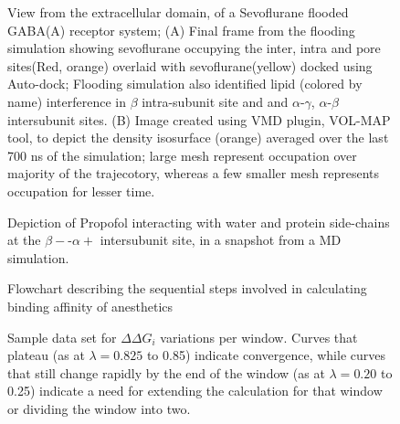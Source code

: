 \documentclass[12pt]{article}
\begin{document}
\begin{figure}
\begin{center}
\centering
\caption{View from the extracellular domain, of a Sevoflurane flooded GABA(A) receptor system; (A) Final frame from the flooding simulation  showing sevoflurane occupying the inter, intra and pore sites(Red, orange) overlaid with sevoflurane(yellow) docked using Auto-dock; Flooding simulation also identified lipid (colored by name) interference in $\beta$ intra-subunit site and and $\alpha$-$\gamma$, $\alpha$-$\beta$ intersubunit sites. (B) Image created using VMD plugin, VOL-MAP tool, to depict the density isosurface (orange)  averaged over the last 700 ns of the simulation; large mesh represent occupation over majority of the trajecotory, whereas a few smaller mesh represents occupation for lesser time.}
\label{fig:sevVolMap}
\end{center}
\end{figure}

\begin{figure}
\begin{center}
\centering
\caption{Depiction of Propofol interacting with water and protein side-chains at the $\beta-$-$\alpha+$ intersubunit site, in a snapshot from a MD simulation.}
\label{fig:PFLhbond}
\end{center}
\end{figure}

\begin{figure}
\begin{center}
\centering
\caption{Flowchart describing  the sequential steps involved in calculating binding affinity of anesthetics}
\label{fig:flowchart_FEP}
\end{center}
\end{figure}

\begin{figure}
\begin{center}
\centering
\caption{Sample data set for $\Delta\Delta G_{i}$ variations per window.%
Curves that plateau (as at $\lambda = 0.825$ to 0.85) indicate convergence, while curves that still change rapidly by the end of the window (as at $\lambda = 0.20$ to 0.25) indicate a need for extending the calculation for that window or dividing the window into two.  }
\label{fig:lambda}
\end{center}
\end{figure}
\end{document}
